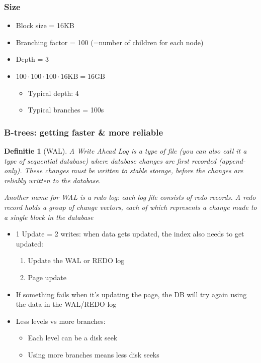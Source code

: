 \documentclass{article}
\newtheorem{theorem}{Definitie}[section]
\begin{document}
\subsubsection{Size}

\begin{itemize}
    \item Block size = 16KB
    \item Branching factor = 100 (=number of children for each node)
    \item Depth = 3
    \item $100 \cdot 100 \cdot 100 \cdot 16\text{KB} = 16\text{GB}$
    \begin{itemize}
        \item Typical depth: 4
        \item Typical branches = 100s
    \end{itemize}
\end{itemize}

\subsubsection{B-trees: getting faster \& more reliable}

\begin{theorem}[WAL]
    A Write Ahead Log is a type of file (you can also call it a type of sequential database) where database changes are first recorded (append-only).
    These changes must be written to stable storage, before the changes are reliably written to the database.

    Another name for WAL is a redo log: each log file consists of redo records. A redo record holds a group of change vectors, each of which represents a change made to a single block in the database
\end{theorem}

\begin{itemize}
    \item 1 Update = 2 writes: when data gets updated, the index also needs to get updated:
    \begin{enumerate}
        \item Update the WAL or REDO log
        \item Page update
    \end{enumerate}
    \item If something fails when it's updating the page, the DB will try again using the data in the WAL/REDO log
    \item Less levels vs more branches:
    \begin{itemize}
        \item Each level can be a disk seek
        \item Using more branches means less disk seeks
    \end{itemize}
\end{itemize}
\end{document}
